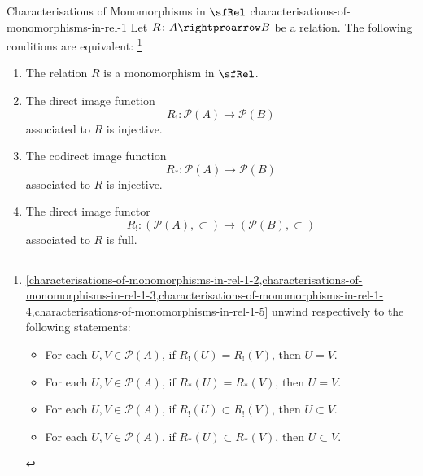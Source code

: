 \begin{proposition}{Characterisations of Monomorphisms in $\sfRel$ \rmI}{characterisations-of-monomorphisms-in-rel-1}%
    Let $R\colon A\rightproarrow B$ be a relation. The following conditions are equivalent:%
    \footnote{%
        \cref{characterisations-of-monomorphisms-in-rel-1-2,characterisations-of-monomorphisms-in-rel-1-3,characterisations-of-monomorphisms-in-rel-1-4,characterisations-of-monomorphisms-in-rel-1-5} unwind respectively to the following statements:
        \begin{itemize}
            \item For each $U,V\in\mathcal{P}(A)$, if $R_{!}(U)=R_{!}(V)$, then $U=V$.%
            \item For each $U,V\in\mathcal{P}(A)$, if $R_{*}(U)=R_{*}(V)$, then $U=V$.
            \item For each $U,V\in\mathcal{P}(A)$, if $R_{!}(U)\subset R_{!}(V)$, then $U\subset V$.
            \item For each $U,V\in\mathcal{P}(A)$, if $R_{*}(U)\subset R_{*}(V)$, then $U\subset V$.
        \end{itemize}
        \par\vspace*{\TCBBoxCorrection}
    }%
    \begin{enumerate}
        \item\label{characterisations-of-monomorphisms-in-rel-1-1}The relation $R$ is a monomorphism in $\sfRel$.
        \item\label{characterisations-of-monomorphisms-in-rel-1-2}The direct image function%
            \[
                R_{!}%
                \colon%
                \mathcal{P}(A)%
                \to%
                \mathcal{P}(B)%
            \]%
            associated to $R$ is injective.
        \item\label{characterisations-of-monomorphisms-in-rel-1-3}The codirect image function
            \[
                R_{*}%
                \colon%
                \mathcal{P}(A)%
                \to%
                \mathcal{P}(B)%
            \]%
            associated to $R$ is injective.
        \item\label{characterisations-of-monomorphisms-in-rel-1-4}The direct image functor
            \[
                R_{!}%
                \colon%
                (\mathcal{P}(A),\subset)%
                \to%
                (\mathcal{P}(B),\subset)%
            \]%
            associated to $R$ is full.

\end{enumerate}
\end{proposition}
